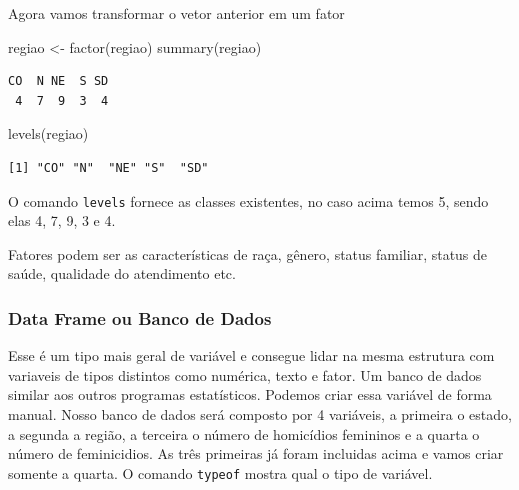 \documentclass[
  letterpaper,
  DIV=11,
  numbers=noendperiod]{scrreprt}
\newenvironment{Shaded}{\begin{snugshade}}{\end{snugshade}}
\newcommand{\FunctionTok}[1]{\textcolor[rgb]{0.28,0.35,0.67}{#1}}
\newcommand{\NormalTok}[1]{\textcolor[rgb]{0.00,0.23,0.31}{#1}}
\newcommand{\OtherTok}[1]{\textcolor[rgb]{0.00,0.23,0.31}{#1}}
\begin{document}
Agora vamos transformar o vetor anterior em um fator

\begin{Shaded}
\begin{Highlighting}[]
\NormalTok{regiao }\OtherTok{\textless{}{-}} \FunctionTok{factor}\NormalTok{(regiao)}
\FunctionTok{summary}\NormalTok{(regiao)}
\end{Highlighting}
\end{Shaded}

\begin{verbatim}
CO  N NE  S SD 
 4  7  9  3  4 
\end{verbatim}

\begin{Shaded}
\begin{Highlighting}[]
\FunctionTok{levels}\NormalTok{(regiao)}
\end{Highlighting}
\end{Shaded}

\begin{verbatim}
[1] "CO" "N"  "NE" "S"  "SD"
\end{verbatim}

O comando \texttt{levels} fornece as classes existentes, no caso acima
temos 5, sendo elas 4, 7, 9, 3 e 4.

Fatores podem ser as características de raça, gênero, status familiar,
status de saúde, qualidade do atendimento etc.

\subsubsection{Data Frame ou Banco de
Dados}\label{data-frame-ou-banco-de-dados}

Esse é um tipo mais geral de variável e consegue lidar na mesma
estrutura com variaveis de tipos distintos como numérica, texto e fator.
Um banco de dados similar aos outros programas estatísticos. Podemos
criar essa variável de forma manual. Nosso banco de dados será composto
por 4 variáveis, a primeira o estado, a segunda a região, a terceira o
número de homicídios femininos e a quarta o número de feminicidios. As
três primeiras já foram incluidas acima e vamos criar somente a quarta.
O comando \texttt{typeof} mostra qual o tipo de variável.
\end{document}
